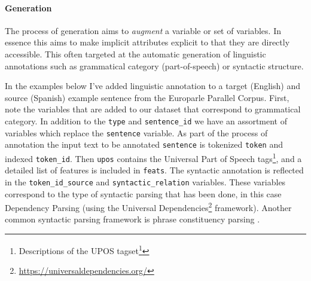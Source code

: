 \documentclass[
]{article}
\DeclareRobustCommand{\href}[2]{#2\footnote{\url{#1}}}
\begin{document}
\hypertarget{generation}{%
\paragraph{Generation}\label{generation}}

The process of generation aims to \emph{augment} a variable or set of variables. In essence this aims to make implicit attributes explicit to that they are directly accessible. This often targeted at the automatic generation of linguistic annotations such as grammatical category (part-of-speech) or syntactic structure.

In the examples below I've added linguistic annotation to a target (English) and source (Spanish) example sentence from the Europarle Parallel Corpus. First, note the variables that are added to our dataset that correspond to grammatical category. In addition to the \texttt{type} and \texttt{sentence\_id} we have an assortment of variables which replace the \texttt{sentence} variable. As part of the process of annotation the input text to be annotated \texttt{sentence} is tokenized \texttt{token} and indexed \texttt{token\_id}. Then \texttt{upos} contains the Universal Part of Speech tags\footnote{\href{https://universaldependencies.org/u/pos/}{Descriptions of the UPOS tagset}}, and a detailed list of features is included in \texttt{feats}. The syntactic annotation is reflected in the \texttt{token\_id\_source} and \texttt{syntactic\_relation} variables. These variables correspond to the type of syntactic parsing that has been done, in this case Dependency Parsing (using the \href{https://universaldependencies.org/}{Universal Dependencies} framework). Another common syntactic parsing framework is phrase constituency parsing \citep{Jurafsky2020}.
\end{document}
